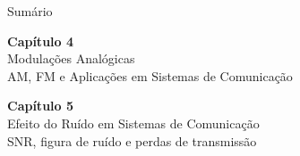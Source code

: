\documentclass[aspectratio=169]{beamer}
\title{\tituloApresentacao}
\subtitle{\subtituloApresentacao}
\author{\autorNome}
\institute{\institutoFinal}
\date{\dataApresentacao}
\begin{document}
\begin{frame}
\titlepage
\end{frame}

\begin{frame}{Sumário}
\tableofcontents[hideallsubsections]
\end{frame}

{
\begin{frame}[plain,c]
\begin{center}
{\Huge\textbf{Capítulo 4}}\\[0.8cm]
{\LARGE Modulações Analógicas}\\[0.5cm]
{\large AM, FM e Aplicações em Sistemas de Comunicação}
\end{center}
\end{frame}
}



{
\begin{frame}[plain,c]
\begin{center}
{\Huge\textbf{Capítulo 5}}\\[0.8cm]
{\LARGE Efeito do Ruído em Sistemas de Comunicação}\\[0.5cm]
{\large SNR, figura de ruído e perdas de transmissão}
\end{center}
\end{frame}
}


\end{document}
